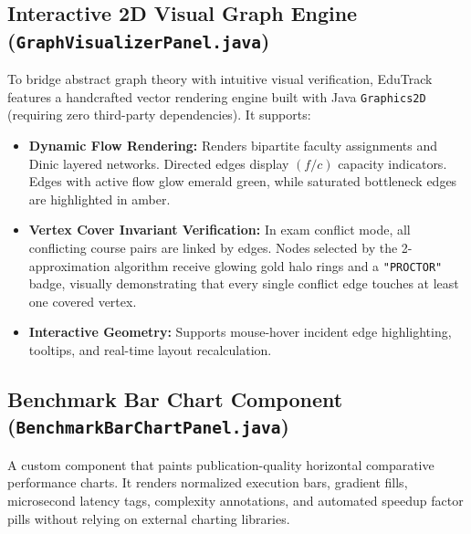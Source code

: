 \subsection{Interactive 2D Visual Graph Engine (\texttt{GraphVisualizerPanel.java})}
To bridge abstract graph theory with intuitive visual verification, EduTrack features a handcrafted vector rendering engine built with Java \texttt{Graphics2D} (requiring zero third-party dependencies). It supports:
\begin{itemize}
    \item \textbf{Dynamic Flow Rendering:} Renders bipartite faculty assignments and Dinic layered networks. Directed edges display $(f / c)$ capacity indicators. Edges with active flow glow emerald green, while saturated bottleneck edges are highlighted in amber.
    \item \textbf{Vertex Cover Invariant Verification:} In exam conflict mode, all conflicting course pairs are linked by edges. Nodes selected by the 2-approximation algorithm receive glowing gold halo rings and a \texttt{"PROCTOR"} badge, visually demonstrating that every single conflict edge touches at least one covered vertex.
    \item \textbf{Interactive Geometry:} Supports mouse-hover incident edge highlighting, tooltips, and real-time layout recalculation.
\end{itemize}

\subsection{Benchmark Bar Chart Component (\texttt{BenchmarkBarChartPanel.java})}
A custom component that paints publication-quality horizontal comparative performance charts. It renders normalized execution bars, gradient fills, microsecond latency tags, complexity annotations, and automated speedup factor pills without relying on external charting libraries.
